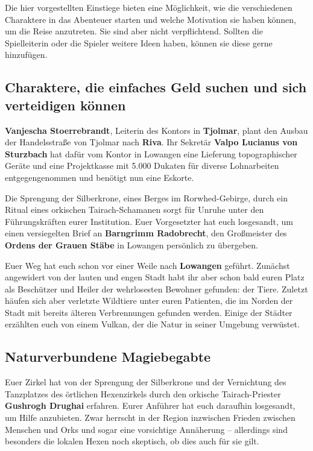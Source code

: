 \neuespalte

Die hier vorgestellten Einstiege bieten eine Möglichkeit, wie die verschiedenen Charaktere in das Abenteuer starten und welche Motivation sie haben können, um die Reise anzutreten.
Sie sind aber nicht verpflichtend.
Sollten die Spielleiterin oder die Spieler weitere Ideen haben, können sie diese gerne hinzufügen.


\subsection[Charaktere, die einfaches Geld suchen]{Charaktere, die einfaches Geld suchen und sich verteidigen können}
\textbf{Vanjescha Stoerrebrandt}, Leiterin des Kontors in \textbf{Tjolmar}, plant den Ausbau der Handelsstraße von Tjolmar nach \textbf{Riva}.
Ihr Sekretär \textbf{Valpo Lucianus von Sturzbach} hat dafür vom Kontor in Lowangen eine Lieferung topographischer Geräte und eine Projektkasse mit 5.000 Dukaten für diverse Lohnarbeiten entgegengenommen und benötigt nun eine Eskorte.

Die Sprengung der Silberkrone, eines Berges im Rorwhed-Gebirge, durch ein Ritual eines orkischen Tairach-Schamanen sorgt für Unruhe unter den Führungskräften eurer Institution.
Euer Vorgesetzter hat euch losgesandt, um einen versiegelten Brief an \textbf{Barngrimm Radobrecht}, den Großmeister des \textbf{Ordens der Grauen Stäbe} in Lowangen persönlich zu übergeben.

Euer Weg hat euch schon vor einer Weile nach \textbf{Lowangen} geführt.
Zunächst angewidert von der lauten und engen Stadt habt ihr aber schon bald euren Platz als Beschützer und Heiler der wehrlosesten Bewohner gefunden: der Tiere.
Zuletzt häufen sich aber verletzte Wildtiere unter euren Patienten, die im Norden der Stadt mit bereits älteren Verbrennungen gefunden werden.
Einige der Städter erzählten euch von einem Vulkan, der die Natur in seiner Umgebung verwüstet.


\subsection{Naturverbundene Magiebegabte}
Euer Zirkel hat von der Sprengung der Silberkrone und der Vernichtung des Tanzplatzes des örtlichen Hexenzirkels durch den orkische Tairach-Priester \textbf{Gushrogh Drughai} erfahren.
Eurer Anführer hat euch daraufhin losgesandt, um Hilfe anzubieten.
Zwar herrscht in der Region inzwischen Frieden zwischen Menschen und Orks und sogar eine vorsichtige Annäherung --
allerdings sind besonders die lokalen Hexen noch skeptisch, ob dies auch für sie gilt.

